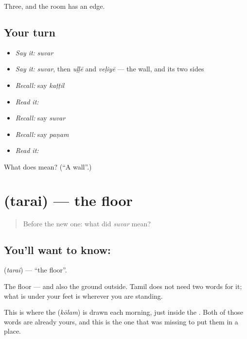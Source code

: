 \begin{grammarlens}[title={What you've built}]
Three, and the room has an edge.
\end{grammarlens}

\subsection*{Your turn}
\begin{itemize}
\raggedright
  \item \emph{Say it:} \emph{suvar}
  \item \emph{Say it:} \emph{suvar}, then \emph{uḷḷē} and \emph{veḷiyē} — the wall, and its two sides
  \item \emph{Recall:} say \emph{kaṭṭil}
  \item \emph{Read it:} \textbf{}
  \item \emph{Recall:} say \emph{suvar}
  \item \emph{Recall:} say \emph{paṇam}
  \item \emph{Read it:} \textbf{}
\end{itemize}

\begin{tcolorbox}[breakable,colback=teal!4,colframe=teal!35!black,title={Before you move on}]
What does  mean? (\textquotedblleft{}A wall\textquotedblright{}.)
\end{tcolorbox}
\section[\texorpdfstring{\ta{தரை} (tarai)}{தரை (tarai)}]{ (tarai) — the floor}

\label{lesson:TA-C70-floor}



\begin{quote}
Before the new one: what did \emph{suvar} mean?
\end{quote}

\subsection*{You'll want to know: }
\textbf{} (\emph{tarai}) — \textquotedblleft{}the floor\textquotedblright{}.

The floor — and also the ground outside. Tamil does not need two words for it; what is under your feet is  wherever you are standing.

This is where the  (\emph{kōlam}) is drawn each morning, just inside the . Both of those words are already yours, and this is the one that was missing to put them in a place.

